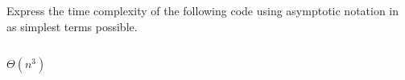 \begin{prob}
    Express the time complexity of the following code using asymptotic
    notation in as simplest terms possible.

    \inputminted{python}{./code.py}

    \begin{soln}
        $\Theta(n^3)$
    \end{soln}

\end{prob}
